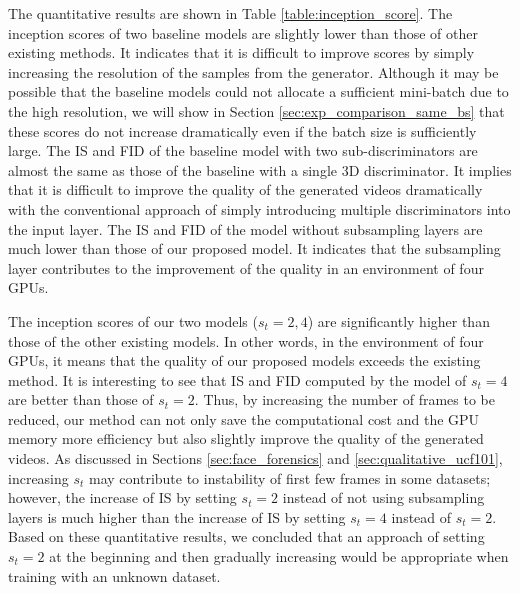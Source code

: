 \documentclass[twocolumn]{svjour3}
\def\Table#1{Table \ref{table:#1}}
\def\Sec#1{Section \ref{sec:#1}}
\begin{document}
The quantitative results are shown in \Table{inception_score}.
The inception scores of two baseline models are slightly lower than those of other existing methods.
It indicates that it is difficult to improve scores
by simply increasing the resolution of the samples from the generator.
Although it may be possible that the baseline models could not allocate a sufficient mini-batch
due to the high resolution, we will show in \Sec{exp_comparison_same_bs} that
these scores do not increase dramatically even if the batch size is sufficiently large.
The IS and FID of the baseline model with two sub-discriminators are almost the same
as those of the baseline with a single 3D discriminator.
It implies that it is difficult to improve the quality of the generated videos dramatically
with the conventional approach of simply introducing multiple discriminators into the input layer.
The IS and FID of the model without subsampling layers are much lower than those of our proposed model.
It indicates that the subsampling layer contributes to the improvement of the quality
in an environment of four GPUs.













The inception scores of our two models ($s_t=2, 4$) are
significantly higher than those of the other existing models.
In other words, in the environment of four GPUs,
it means that the quality of our proposed models exceeds the existing method.
It is interesting to see that IS and FID computed by the model of $s_t=4$
are better than those of $s_t=2$.
Thus, by increasing the number of frames to be reduced,
our method can not only save the computational cost and the GPU memory more efficiency
but also slightly improve the quality of the generated videos.
As discussed in Sections \ref{sec:face_forensics} and \ref{sec:qualitative_ucf101},
increasing $s_t$ may contribute to instability of first few frames in some datasets;
however, the increase of IS by setting $s_t=2$ instead of not using subsampling layers
is much higher than the increase of IS by setting $s_t=4$ instead of $s_t=2$.
Based on these quantitative results, we concluded that an approach of setting
$s_t=2$ at the beginning and then gradually increasing would be appropriate
when training with an unknown dataset.
\end{document}
